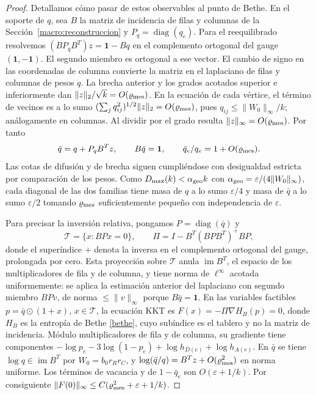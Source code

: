 \begin{proof}
Detallamos cómo pasar de estos observables al punto de Bethe. En el soporte de $q$, sea $B$ la matriz
de incidencia de filas y columnas de la Sección~\ref{macro:reconstruccion} y
$P_q=\operatorname{diag}(q_e)$. Para el reequilibrado resolvemos
$(BP_qB^T)z=\mathbf1-Bq$ en el complemento ortogonal del gauge $(\mathbf1,-\mathbf1)$. El segundo
miembro es ortogonal a ese vector. El cambio de signo en las coordenadas de columna convierte la
matriz en el laplaciano de filas y columnas de pesos $q$. La brecha anterior y los grados acotados
superior e inferiormente dan $\|z\|_2/\sqrt{k}=O(\varrho_{\rm mes})$. En la ecuación de cada vértice,
el término
de vecinos es a lo sumo $(\sum_j q_{ij}^2)^{1/2}\|z\|_2=O(\varrho_{\rm mes})$, pues
$q_{ij}\le\|W_0\|_\infty/k$;
análogamente en columnas. Al dividir por el grado resulta $\|z\|_\infty=O(\varrho_{\rm mes})$. Por tanto
\[
 \bar q=q+P_qB^Tz,\qquad B\bar q=\mathbf1,\qquad
 \bar q_e/q_e=1+O(\varrho_{\rm mes}).
\]
Las cotas de difusión y de brecha siguen cumpliéndose con desigualdad estricta por comparación de los
pesos. Como $D_{\max}(k)<\alpha_{\rm geo} k$ con $\alpha_{\rm geo}=\varepsilon/(4\|W_0\|_\infty)$, cada
diagonal de las
dos familias tiene masa de $q$
a lo sumo $\varepsilon/4$ y masa de $\bar q$ a lo sumo $\varepsilon/2$ tomando $\varrho_{\rm mes}$
suficientemente pequeño con independencia de $\varepsilon$.

Para precisar la inversión relativa, pongamos $P=\operatorname{diag}(\bar q)$ y
\[
 \mathcal T=\{x:BPx=0\},\qquad
 \Pi=I-B^T(BPB^T)^+BP ,
\]
donde el superíndice $+$ denota la inversa en el complemento ortogonal del gauge, prolongada por cero. Esta
proyección sobre $\mathcal T$ anula $\operatorname{im}B^T$, el espacio de los multiplicadores de fila
y de columna, y tiene norma de $\ell^\infty$
acotada uniformemente: se aplica la estimación anterior del laplaciano con segundo miembro $BPv$, de
norma $\le\|v\|_\infty$ porque $B\bar q=\mathbf1$. En las variables factibles ${p=\bar q\odot(1+x)}$,
$x\in\mathcal T$, la ecuación KKT es $F(x)=-\Pi\nabla H_B(p)=0$, donde $H_B$ es la entropía de
Bethe \eqref{bethe}, cuyo subíndice es el tablero y no la matriz de incidencia. Módulo multiplicadores
de fila y de columna, su gradiente tiene componentes
$-\log p_e-3\log(1-p_e)+\log h_{D(e)}+\log h_{A(e)}$. En $\bar q$ se tiene
$\log q\in\operatorname{im}B^T$
por $W_0=b_0 r_Rr_C$, y $\log(\bar q/q)=B^Tz+O(\varrho_{\rm mes}^2)$ en norma uniforme. Los términos de
vacancia
y de $1-\bar q_e$ son $O(\varepsilon+1/k)$. Por consiguiente $\|F(0)\|_\infty\le
C(\varrho_{\rm mes}^2+\varepsilon+1/k)$.


\end{proof}
